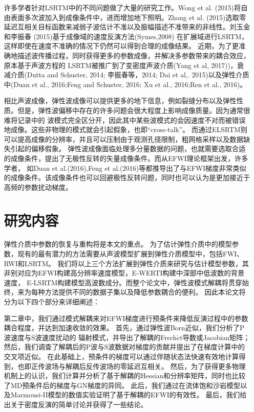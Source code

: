 许多学者针对LSRTM中的不同问题做了大量的研究工作。Wong et al.
(2015)\cite{WongEtAl2015}将自由表面多次波加入到成像条件中，进而增加地下照明。Zhang et al.
(2015)\cite{ZhangEtAl2015}选取零延迟互相关目标函数来减弱子波估计不准以及振幅描述不准带来的非线性。刘玉金和李振春
(2015)\cite{刘玉金2015}基于成像域的速度反演方法(Symes,2008\cite{Symes2008a})
在扩展域进行LSRTM，这样即使在速度不准确的情况下仍然可以得到合理的成像结果。
近期，为了更准确地描述波传播过程，同时获得更多的参数成像，并解决多参数带来的耦合效应，原本基于声波方程的
LSRTM被推广到了变密度声波介质(Yang et al, 2017)\cite{Yang2017})，衰减介质(Dutta and
Schuster, 2014\cite{DuttaEtAl2014}; 李振春等，2014\cite{李振春2014}; Dai et al,.
2015\cite{Dai2015})以及弹性介质中(Duan et al., 2016\cite{Duan2016};Feng and Schuster,
2016\cite{Feng2016}; Xu et al., 2016\cite{Xu2016};Ren et al., 2016\cite{RenEtAl2016})。

相比声波成像，弹性波成像可以提供更多的地下信息，例如裂缝分布以及弹性性质。但是，弹性波偏移中存在的许多问题会很大程度上影响成像质量。因为通常很难将记录中的
波模式完全区分开，因此其中某些波模式的会因速度不对而被错误地成像。这些非物理的模式就会引起假象，也即“cross-talk”。
而通过ELSRTM则可以提高成像的分辨率，并且可以压制由于观测孔径限制，粗网格采样以及数据缺失引起的偏移假象。
弹性波成像面临处理多分量数据的问题，也就需要选取合适的成像条件，{\color{red}\cite{Wang2016}提出了无极性反转的矢量成像条件。}而从EFWI理论框架出发，许多学者，
如Duan et al.(2016)\cite{Duan2016},Feng et
al.(2016)\cite{Feng2016}等都推导出了与EFWI梯度非常类似的成像条件。该成像条件也可以回避极性反转问题，同时也可以认为是更加接近于高频的参数扰动梯度。
\section{研究内容}
弹性介质中参数的恢复与重构将是本文的重点。
为了估计弹性介质中的模型参数，现有的最有潜力的方法需要从声波模型扩展到弹性介质模型中，包括FWI、RWI和LSRTM。
我们将以上三个方法扩展到弹性介质来研究与估计模型参数，其非别对应为EFWI构建高分辨率速度模型，E-WERTI构建中深部中低波数的背景速度，
E-LSRTM构建模型高波数成分。而整个论文中，弹性波模式解耦将贯穿始终，来为每种方法提供不同的数据子集以及降低参数耦合的便利。
因此本论文将分为以下四个部分来详细阐述：

第二章中，我们通过模式解耦来对EFWI梯度进行预条件来降低反演过程中的参数耦合程度，并达到加速收敛的效果。
首先，通过弹性波Born近似，我们分析了P波速度与S波速度扰动的
辐射模式，并导出了解耦的Frech{$\acute{e}$}t导数或Jacobian矩阵；然后，我们调查了解耦后的P波与S波数据对梯度的贡献并提出了在梯度计算中的交叉项近似。
在此基础上，预条件的梯度可以通过伴随状态法\cite[]{plessix2006}快速有效地计算得到，也即正传波场与解耦后反传波场的零延迟互相关。
然后，为了获得更多物理机制上的认识，我们计算并分析了基于解耦的Hessian和分辨率矩阵，同时也比较了MD预条件后的梯度与GN梯度的异同。
此后，我们通过在流体饱和沙岩模型以及Marmousi-II模型的数值实验证明了基于解耦的EFWI的有效性。
最后，我们给出关于密度反演的简单讨论并获得了一些结论。

